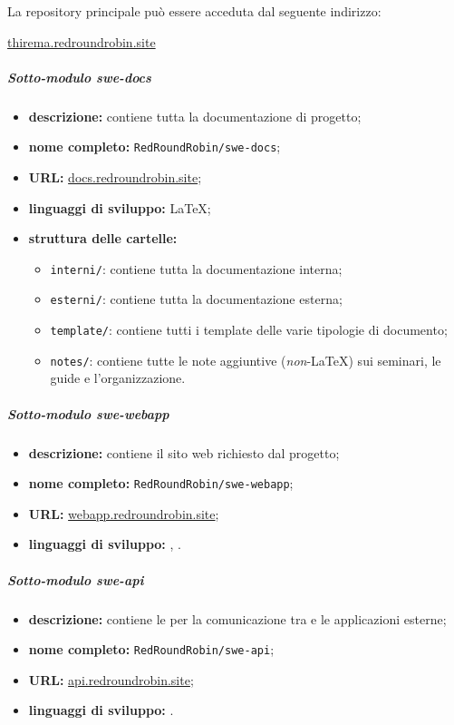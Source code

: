 		La repository principale può essere acceduta dal seguente indirizzo:

		\href{https://github.com/RedRoundRobin/swe-thirema}{thirema.redroundrobin.site}

		\subparagraph{Sotto-modulo swe-docs}

		\begin{itemize}
		 	\item \textbf{descrizione:} contiene tutta la documentazione di progetto;
		 	\item \textbf{nome completo:} \verb!RedRoundRobin/swe-docs!;
		 	\item \textbf{URL:} \href{https://github.com/RedRoundRobin/swe-docs}{docs.redroundrobin.site};
		 	\item \textbf{linguaggi di sviluppo:} \LaTeX{};
		 	\item \textbf{struttura delle cartelle:}
			\begin{itemize}
				\item \verb!interni/!: contiene tutta la documentazione interna;
				\item \verb!esterni/!: contiene tutta la documentazione esterna;
				\item \verb!template/!: contiene tutti i template delle varie tipologie di documento;
				\item \verb!notes/!: contiene tutte le note aggiuntive (\textit{non}-\LaTeX{}) sui seminari, le guide e l'organizzazione.
			\end{itemize}
		 \end{itemize}

		\subparagraph{Sotto-modulo swe-webapp}

		\begin{itemize}
		 	\item \textbf{descrizione:} contiene il sito web richiesto dal progetto;
		 	\item \textbf{nome completo:} \verb!RedRoundRobin/swe-webapp!;
		 	\item \textbf{URL:} \href{https://github.com/RedRoundRobin/swe-webapp}{webapp.redroundrobin.site};
		 	\item \textbf{linguaggi di sviluppo:} , .
		 \end{itemize}

		\subparagraph{Sotto-modulo swe-api}

		\begin{itemize}
		 	\item \textbf{descrizione:} contiene le  per la comunicazione tra  e le applicazioni esterne;
		 	\item \textbf{nome completo:} \verb!RedRoundRobin/swe-api!;
		 	\item \textbf{URL:} \href{https://github.com/RedRoundRobin/swe-api}{api.redroundrobin.site};
		 	\item \textbf{linguaggi di sviluppo:} .
		 \end{itemize}

